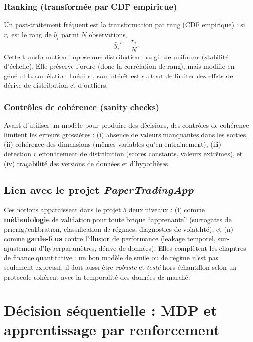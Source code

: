 \documentclass[11pt,a4paper]{article}
\newcommand{\1}{\mathbf{1}}
\begin{document}
\subsubsection{Ranking (transform\'ee par CDF empirique)}
Un post-traitement fr\'equent est la transformation par rang (CDF empirique) : si $r_i$ est le rang de $\widehat y_i$ parmi $N$ observations,
\[
\widehat y_i'=\frac{r_i}{N}.
\]
Cette transformation impose une distribution marginale uniforme (stabilit\'e d'\'echelle). Elle pr\'eserve l'ordre (donc la corr\'elation de rang),
mais modifie en g\'en\'eral la corr\'elation lin\'eaire ; son int\'er\^et est surtout de limiter des effets de d\'erive de distribution et d'outliers.

\subsubsection{Contr\^oles de coh\'erence (sanity checks)}
Avant d'utiliser un mod\`ele pour produire des d\'ecisions, des contr\^oles de coh\'erence limitent les erreurs grossi\`eres : (i) absence de valeurs manquantes
dans les sorties, (ii) coh\'erence des dimensions (m\^emes variables qu'en entra\^{i}nement), (iii) d\'etection d'effondrement de distribution (scores constants,
valeurs extr\^emes), et (iv) tra\c{c}abilit\'e des versions de donn\'ees et d'hypoth\`eses.

\subsection{Lien avec le projet \emph{PaperTradingApp}}

Ces notions apparaissent dans le projet \`a deux niveaux : (i) comme \textbf{m\'ethodologie} de validation pour toute brique ``apprenante''
(surrogates de pricing/calibration, classification de r\'egimes, diagnostics de volatilité), et (ii) comme \textbf{garde-fous} contre l'illusion de
performance (leakage temporel, sur-ajustement d'hyperparam\`etres, d\'erive de donn\'ees). Elles compl\`etent les chapitres de finance quantitative :
un bon mod\`ele de smile ou de r\'egime n'est pas seulement expressif, il doit aussi \^etre \emph{robuste} et \emph{test\'e} hors \'echantillon selon
un protocole coh\'erent avec la temporalit\'e des donn\'ees de march\'e.

\section{D\'ecision s\'equentielle : MDP et apprentissage par renforcement}
\end{document}
